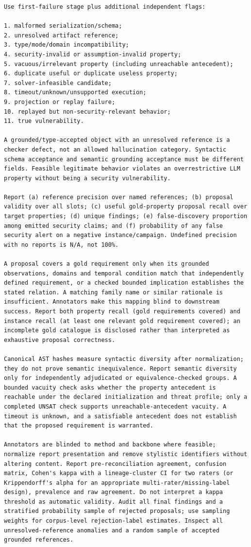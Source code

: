 \documentclass[11pt,a4paper]{article}
\begin{document}
\begin{verbatim}
Use first-failure stage plus additional independent flags:

1. malformed serialization/schema;
2. unresolved artifact reference;
3. type/mode/domain incompatibility;
4. security-invalid or assumption-invalid property;
5. vacuous/irrelevant property (including unreachable antecedent);
6. duplicate useful or duplicate useless property;
7. solver-infeasible candidate;
8. timeout/unknown/unsupported execution;
9. projection or replay failure;
10. replayed but non-security-relevant behavior;
11. true vulnerability.

A grounded/type-accepted object with an unresolved reference is a checker defect, not an allowed hallucination category. Syntactic schema acceptance and semantic grounding acceptance must be different fields. Feasible legitimate behavior violates an overrestrictive LLM property without being a security vulnerability.

Report (a) reference precision over named references; (b) proposal validity over all slots; (c) useful gold-property proposal recall over target properties; (d) unique findings; (e) false-discovery proportion among emitted security claims; and (f) probability of any false security alert on a negative instance/campaign. Undefined precision with no reports is N/A, not 100%.

A proposal covers a gold requirement only when its grounded observations, domains and temporal condition match that independently defined requirement, or a checked bounded implication establishes the stated relation. A matching family name or similar rationale is insufficient. Annotators make this mapping blind to downstream success. Report both property recall (gold requirements covered) and instance recall (at least one relevant gold requirement covered); an incomplete gold catalogue is disclosed rather than interpreted as exhaustive proposal correctness.

Canonical AST hashes measure syntactic diversity after normalization; they do not prove semantic inequivalence. Report semantic diversity only for independently adjudicated or equivalence-checked groups. A bounded vacuity check asks whether the property antecedent is reachable under the declared initialization and threat profile; only a completed UNSAT check supports unreachable-antecedent vacuity. A timeout is unknown, and a satisfiable antecedent does not establish that the proposed requirement is warranted.

Annotators are blinded to method and backbone where feasible; normalize report presentation and remove stylistic identifiers without altering content. Report pre-reconciliation agreement, confusion matrix, Cohen's kappa with a lineage-cluster CI for two raters (or Krippendorff's alpha for an appropriate multi-rater/missing-label design), prevalence and raw agreement. Do not interpret a kappa threshold as automatic validity. Audit all final findings and a stratified probability sample of rejected proposals; use sampling weights for corpus-level rejection-label estimates. Inspect all unresolved-reference anomalies and a random sample of accepted grounded references.


\end{verbatim}
\end{document}
